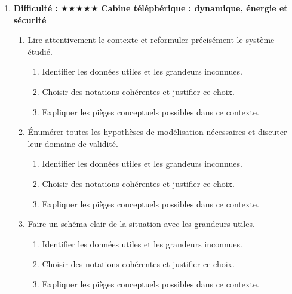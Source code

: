 \documentclass[11pt,a4paper]{article}
\newcommand{\etoiles}[1]{\textbf{Difficulté : }#1}
\begin{document}
\begin{enumerate}[label=\textbf{Très long \arabic*.},leftmargin=*]
\begin{enumerate}[label=\textbf{\arabic*)}]
\begin{enumerate}[label=\alph*)]
\item Proposer une ouverture vers une situation réelle plus complexe.
\end{enumerate}
\item Rédiger une conclusion scientifique : résultats, limites, prolongements vers la Terminale ou au-delà.
\begin{enumerate}[label=\alph*)]
\item Comparer au moins deux scénarios différents.
\item Discuter la robustesse du résultat face à une variation de paramètre.
\item Proposer une ouverture vers une situation réelle plus complexe.
\end{enumerate}
\end{enumerate}
\item \etoiles{★★★★★}
\textbf{Cabine téléphérique : dynamique, énergie et sécurité}
\begin{enumerate}[label=\textbf{\arabic*)}]
\item Lire attentivement le contexte et reformuler précisément le système étudié.
\begin{enumerate}[label=\alph*)]
\item Identifier les données utiles et les grandeurs inconnues.
\item Choisir des notations cohérentes et justifier ce choix.
\item Expliquer les pièges conceptuels possibles dans ce contexte.
\end{enumerate}
\item Énumérer toutes les hypothèses de modélisation nécessaires et discuter leur domaine de validité.
\begin{enumerate}[label=\alph*)]
\item Identifier les données utiles et les grandeurs inconnues.
\item Choisir des notations cohérentes et justifier ce choix.
\item Expliquer les pièges conceptuels possibles dans ce contexte.
\end{enumerate}
\item Faire un schéma clair de la situation avec les grandeurs utiles.
\begin{enumerate}[label=\alph*)]
\item Identifier les données utiles et les grandeurs inconnues.
\item Choisir des notations cohérentes et justifier ce choix.
\item Expliquer les pièges conceptuels possibles dans ce contexte.

\end{enumerate}
\end{enumerate}
\end{enumerate}
\end{document}
